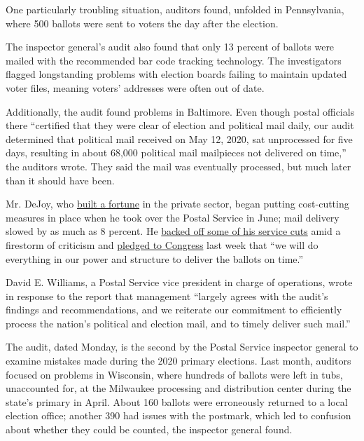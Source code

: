 One particularly troubling situation, auditors found, unfolded in
Pennsylvania, where 500 ballots were sent to voters the day after the
election.

The inspector general's audit also found that only 13 percent of ballots
were mailed with the recommended bar code tracking technology. The
investigators flagged longstanding problems with election boards failing
to maintain updated voter files, meaning voters' addresses were often
out of date.

Additionally, the audit found problems in Baltimore. Even though postal
officials there ``certified that they were clear of election and
political mail daily, our audit determined that political mail received
on May 12, 2020, sat unprocessed for five days, resulting in about
68,000 political mail mailpieces not delivered on time,'' the auditors
wrote. They said the mail was eventually processed, but much later than
it should have been.

Mr. DeJoy, who
\href{https://www.nytimes3xbfgragh.onion/article/general-louis-dejoy-postmaster.html}{built
a fortune} in the private sector, began putting cost-cutting measures in
place when he took over the Postal Service in June; mail delivery slowed
by as much as 8 percent. He
\href{https://www.nytimes3xbfgragh.onion/2020/08/18/us/politics/postal-service-suspends-changes.html}{backed
off some of his service cuts} amid a firestorm of criticism and
\href{https://www.nytimes3xbfgragh.onion/2020/08/24/us/politics/postal-service-dejoy-testimony.html}{pledged
to Congress} last week that ``we will do everything in our power and
structure to deliver the ballots on time.''

David E. Williams, a Postal Service vice president in charge of
operations, wrote in response to the report that management ``largely
agrees with the audit's findings and recommendations, and we reiterate
our commitment to efficiently process the nation's political and
election mail, and to timely deliver such mail.''

The audit, dated Monday, is the second by the Postal Service inspector
general to examine mistakes made during the 2020 primary elections. Last
month, auditors focused on problems in Wisconsin, where hundreds of
ballots were left in tubs, unaccounted for, at the Milwaukee processing
and distribution center during the state's primary in April. About 160
ballots were erroneously returned to a local election office; another
390 had issues with the postmark, which led to confusion about whether
they could be counted, the inspector general found.

